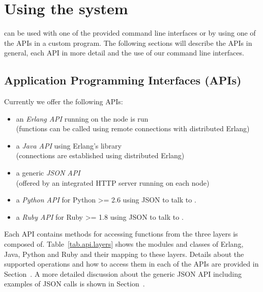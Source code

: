 \chapter{Using the system}
\label{chapter.systemuse}

\scalaris{} can be used with one of the provided command line interfaces or
by using one of the APIs in a custom program. The following sections will
describe the APIs in general, each API in more detail and the use of our
command line interfaces.

\section{Application Programming Interfaces (APIs)}
\label{chapter.systemuse.apis}

Currently we offer the following APIs:
\begin{itemize}
  \item an \emph{Erlang API} running on the node \scalaris{} is run\\
        (functions can be called using remote connections with distributed
        Erlang)
  \item a \emph{Java API} using Erlang's  library\\
        (connections are established using distributed Erlang)
  \item a generic \emph{JSON API}\\
        (offered by an integrated HTTP server running on each \scalaris{} node)
  \item a \emph{Python API} for Python >= 2.6 using JSON to talk to \scalaris{}.
  \item a \emph{Ruby API} for Ruby >= 1.8 using JSON to talk to \scalaris{}.
\end{itemize}

Each API contains methods for accessing functions from the three layers
\scalaris{} is composed of.  Table~\ref{tab.api.layers} shows the modules
and classes of Erlang, Java, Python and Ruby and their mapping to these
layers. Details about the supported operations and how to access them in
each of the APIs are provided in Section~. A more
detailed discussion about the generic JSON API including examples of JSON
calls is shown in Section~.

